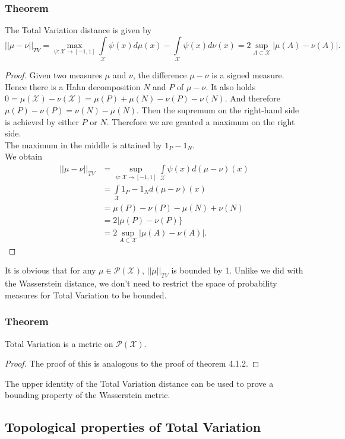 \documentclass[11pt,a4paper]{article}
\begin{document}
\subsubsection{Theorem}
The Total Variation distance is given by
\[
||\mu-\nu||_{TV} = \max\limits_{\psi:\mathcal{X}\rightarrow{}[-1,1]}\int\limits_{\mathcal{X}}\psi(x)d\mu(x) - \int\limits_{\mathcal{X}}\psi(x)d\nu(x) = 2\sup\limits_{A\subset\mathcal{X}}|\mu(A)-\nu(A)|. 
\]
\begin{proof}
Given two measures $\mu$ and $\nu$, the difference $\mu-\nu$ is a signed measure. Hence there is a Hahn decomposition $N$ and $P$ of $\mu-\nu$.
It also holds $0=\mu(\mathcal{X})-\nu(\mathcal{X}) = \mu(P)+\mu(N)-\nu(P)-\nu(N).$ And therefore $\mu(P)-\nu(P) = \nu(N)-\mu(N).$ Then the supremum on the right-hand side is achieved by either $P$ or $N$. Therefore we are granted a maximum on the right side.\vspace{1em}\\
The maximum in the middle is attained by $1_{P}-1_{N}$.\vspace{1em}\\
We obtain
\begin{align*}
||\mu-\nu||_{TV} &= \sup\limits_{\psi:\mathcal{X}\rightarrow{}[-1,1]}\int\limits_{\mathcal{X}}\psi(x)d(\mu-\nu)(x) \\&= \int\limits_{\mathcal{X}}1_{P}-1_{N}d(\mu-\nu)(x) \\&= \mu(P)-\nu(P) - \mu(N)+\nu(N) \\[3pt]&= 2|\mu(P)-\nu(P)\rbrace \\[3pt]&= 2\sup\limits_{A\subset\mathcal{X}}|\mu(A)-\nu(A)|.
\end{align*} 
\end{proof}
\noindent{}It is obvious that for any $\mu\in\mathcal{P(X)}$, $||\mu||_{TV}$ is bounded by 1. Unlike we did with the Wasserstein distance, we don't need to restrict the space of probability measures for Total Variation to be bounded.
\subsubsection{Theorem}
Total Variation is a metric on $\mathcal{P(X)}$.
\begin{proof}
The proof of this is analogous to the proof of theorem 4.1.2.
\end{proof}
\noindent{}The upper identity of the Total Variation distance can be used to prove a bounding property of the Wasserstein metric.
\subsection{Topological properties of Total Variation}
\end{document}
